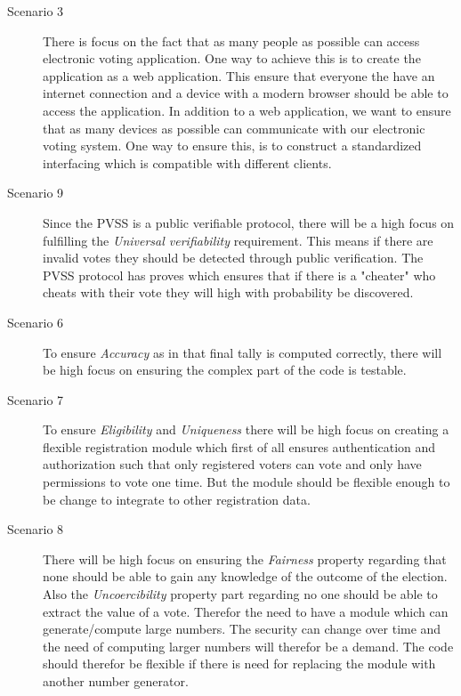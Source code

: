 \begin{description}
    \item [Scenario 3]
       There is focus on the fact that as many people as possible can access electronic voting application. One way to achieve this is to create the application as a web application. This ensure that everyone the have an internet connection and a device with a modern browser should be able to access the application. In addition to a web application, we want to ensure that as many devices as possible can communicate with our electronic voting system. One way to ensure this, is to construct a standardized interfacing which is compatible with different clients.
    
     \item [Scenario 9]
         Since the PVSS is a public verifiable protocol, there will be a high focus on fulfilling the \textit{Universal verifiability} requirement. This means if there are invalid votes they should be detected through public verification. The PVSS protocol has proves which ensures that if there is a "cheater" who cheats with their vote they will high with probability be discovered.
    
    \item [Scenario 6]
        To ensure \textit{Accuracy} as in that final tally is computed correctly, there will be high focus on ensuring the complex part of the code is testable. 
    
    \item [Scenario 7]    
        To ensure \textit{Eligibility} and \textit{Uniqueness} there will be high focus on creating a flexible registration module which first of all ensures authentication and authorization such that only registered voters can vote and only have permissions to vote one time. But the module should be flexible enough to be change to integrate to other registration data. 
        
     \item [Scenario 8]    
        There will be high focus on ensuring the \textit{Fairness} property regarding that none should be able to gain any knowledge of the outcome of the election. Also the \textit{Uncoercibility} property part regarding no one should be able to extract the value of a vote. Therefor the need to have a module which can generate/compute large numbers. The security can change over time and the need of computing larger numbers will therefor be a demand. The code should therefor be flexible if there is need for replacing the module with another number generator.       
     

\end{description}
